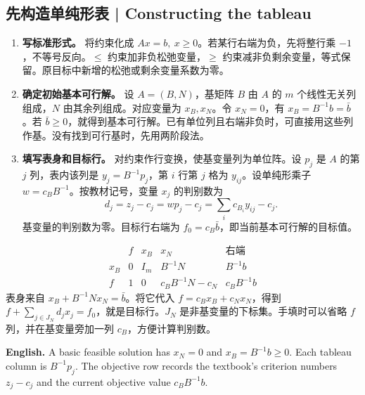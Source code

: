 \documentclass[UTF8,11pt,a4paper]{ctexart}
\newcommand{\EN}[1]{\par\noindent \textbf{English.} #1\par}
\begin{document}
\subsection{先构造单纯形表 | Constructing the tableau}
\begin{enumerate}[label=\arabic*.]
\item \textbf{写标准形式。} 将约束化成 $Ax=b,\ x\ge0$。若某行右端为负，先将整行乘 $-1$，不等号反向。$\le$ 约束加非负松弛变量，$\ge$ 约束减非负剩余变量，等式保留。原目标中新增的松弛或剩余变量系数为零。
\item \textbf{确定初始基本可行解。} 设 $A=(B,N)$，基矩阵 $B$ 由 $A$ 的 $m$ 个线性无关列组成，$N$ 由其余列组成。对应变量为 $x_B,x_N$。令 $x_N=0$，有 $x_B=B^{-1}b=\bar b$。若 $\bar b\ge0$，就得到基本可行解。已有单位列且右端非负时，可直接用这些列作基。没有找到可行基时，先用两阶段法。
\item \textbf{填写表身和目标行。} 对约束作行变换，使基变量列为单位阵。设 $p_j$ 是 $A$ 的第 $j$ 列，表内该列是 $y_j=B^{-1}p_j$，第 $i$ 行第 $j$ 格为 $y_{ij}$。设单纯形乘子 $w=c_B B^{-1}$。按教材记号，变量 $x_j$ 的判别数为
\[
d_j=z_j-c_j=wp_j-c_j=\sum_i c_{B_i}y_{ij}-c_j .
\]
基变量的判别数为零。目标行右端为 $f_0=c_B\bar b$，即当前基本可行解的目标值。
\end{enumerate}
\[
\begin{array}{c|ccc|c}
 & f & x_B & x_N & \text{右端}\\\hline
 x_B & 0 & I_m & B^{-1}N & B^{-1}b\\
 f & 1 & 0 & c_B B^{-1}N-c_N & c_B B^{-1}b
\end{array}
\]
表身来自 $x_B+B^{-1}Nx_N=\bar b$。将它代入 $f=c_Bx_B+c_Nx_N$，得到 $f+\sum_{j\in J_N}d_jx_j=f_0$，就是目标行。$J_N$ 是非基变量的下标集。手填时可以省略 $f$ 列，并在基变量旁加一列 $c_B$，方便计算判别数。
\EN{A basic feasible solution has $x_N=0$ and $x_B=B^{-1}b\ge0$. Each tableau column is $B^{-1}p_j$. The objective row records the textbook's criterion numbers $z_j-c_j$ and the current objective value $c_BB^{-1}b$.}
\end{document}
